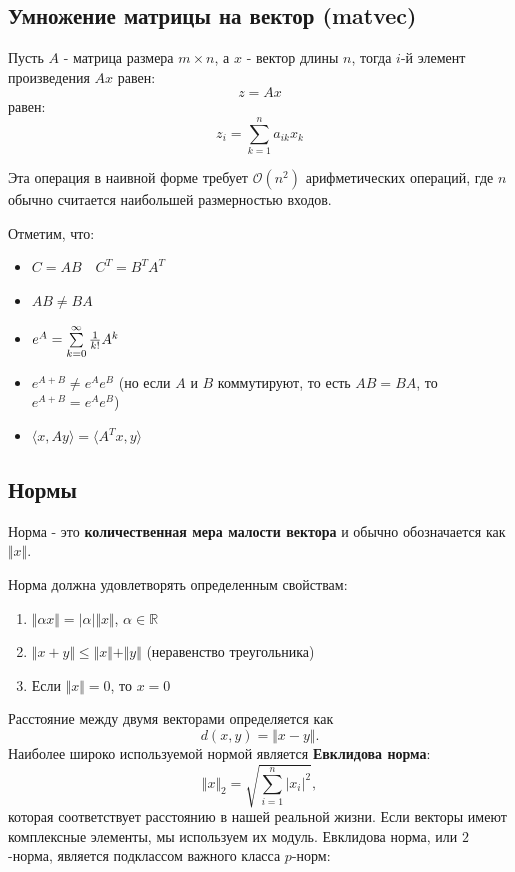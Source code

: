 \documentclass[
  russian,
  letterpaper,
  DIV=11,
  numbers=noendperiod]{scrartcl}
\providecommand{\tightlist}{%
  \setlength{\itemsep}{0pt}\setlength{\parskip}{0pt}}
\begin{document}
\subsection{Умножение матрицы на вектор
(matvec)}\label{ux443ux43cux43dux43eux436ux435ux43dux438ux435-ux43cux430ux442ux440ux438ux446ux44b-ux43dux430-ux432ux435ux43aux442ux43eux440-matvec}

Пусть \(A\) - матрица размера \(m \times n\), а \(x\) - вектор длины
\(n\), тогда \(i\)-й элемент произведения \(Ax\) равен: \[
z = Ax
\] равен: \[
z_i = \sum_{k=1}^n a_{ik}x_k
\]

Эта операция в наивной форме требует \(\mathcal{O}(n^2)\) арифметических
операций, где \(n\) обычно считается наибольшей размерностью входов.

Отметим, что:

\begin{itemize}
\tightlist
\item
  \(C = AB \quad C^T = B^T A^T\)
\item
  \(AB \neq BA\)
\item
  \(e^{A} =\sum\limits_{k=0}^{\infty }{1 \over k!}A^{k}\)
\item
  \(e^{A+B} \neq e^{A} e^{B}\) (но если \(A\) и \(B\) коммутируют, то
  есть \(AB = BA\), то \(e^{A+B} = e^{A} e^{B}\))
\item
  \(\langle x, Ay\rangle = \langle A^T x, y\rangle\)
\end{itemize}

\subsection{Нормы}\label{ux43dux43eux440ux43cux44b}

Норма - это \textbf{количественная мера малости вектора} и обычно
обозначается как \(\Vert x \Vert\).

Норма должна удовлетворять определенным свойствам:

\begin{enumerate}
\def\labelenumi{\arabic{enumi}.}
\tightlist
\item
  \(\Vert \alpha x \Vert = \vert \alpha\vert \Vert x \Vert\),
  \(\alpha \in \mathbb{R}\)
\item
  \(\Vert x + y \Vert \leq \Vert x \Vert + \Vert y \Vert\) (неравенство
  треугольника)
\item
  Если \(\Vert x \Vert = 0\), то \(x = 0\)
\end{enumerate}

Расстояние между двумя векторами определяется как \[ 
d(x, y) = \Vert x - y \Vert. 
\] Наиболее широко используемой нормой является \textbf{Евклидова
норма}: \[
\Vert x \Vert_2 = \sqrt{\sum_{i=1}^n |x_i|^2},
\] которая соответствует расстоянию в нашей реальной жизни. Если векторы
имеют комплексные элементы, мы используем их модуль. Евклидова норма,
или \(2\)-норма, является подклассом важного класса \(p\)-норм:
\end{document}
